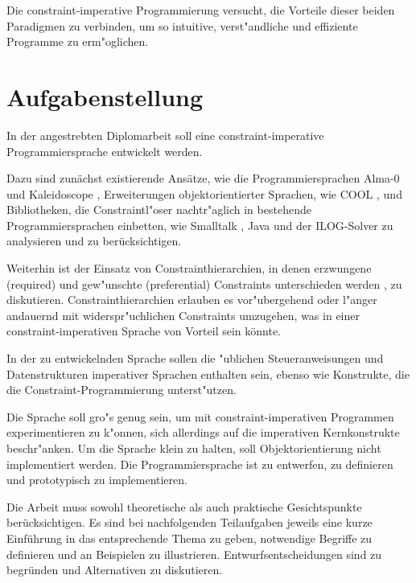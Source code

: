Die constraint-imperative Programmierung versucht, die Vorteile dieser
beiden Paradigmen zu verbinden, um so intuitive, verst"andliche und
effiziente Programme zu erm"oglichen.

\section*{Aufgabenstellung}

In der angestrebten Diplomarbeit soll eine constraint-imperative 
Programmiersprache entwickelt werden.

Dazu sind zun\"achst existierende Ans\"atze, wie die
Programmiersprachen Alma-0 \cite{apt97search,apt98alma} und
Kaleidoscope \cite{lopez94kaleidoscope,lopez94implementing},
Erweiterungen objektorientierter Sprachen, wie COOL
\cite{avesani90cool}, und Bibliotheken, die Constraintl"oser
nachtr"aglich in bestehende Programmiersprachen einbetten, wie
Smalltalk \cite{pachet95mixing}, Java
\cite{abdennadher01:jack:inp,Jack2} und der ILOG-Solver \cite{ILOG} zu
analysieren und zu ber\"ucksichtigen.

Weiterhin ist der Einsatz von Constrainthierarchien, in denen
erzwungene (required) und gew"unschte (preferential) Constraints
unterschieden werden
\cite{borning92constrainthierarchies,bartakHierarchies1}, zu
diskutieren.  Constrainthierarchien erlauben es vor"ubergehend oder
l"anger andauernd mit widerspr"uchlichen Constraints umzugehen, was in
einer constraint-imperativen Sprache von Vorteil sein k\"onnte.

In der zu entwickelnden Sprache sollen die "ublichen Steueranweisungen und
Datenstrukturen imperativer Sprachen enthalten sein, 
ebenso wie Konstrukte, die die Constraint-Programmierung unterst"utzen.

Die Sprache soll gro"s genug sein, um mit con\-straint-im\-perativen
Programmen experimentieren zu k"onnen, sich allerdings auf die
imperativen Kernkonstrukte beschr"anken. 
Um die Sprache klein zu halten, soll Objektorientierung nicht implementiert werden.
%
Die Programmiersprache ist zu entwerfen, zu definieren und
prototypisch zu implementieren.

Die Arbeit muss sowohl theoretische als auch praktische Gesichtspunkte 
ber\"ucksichtigen. Es sind bei nachfolgenden Teilaufgaben jeweils 
%
eine kurze Einf\"uhrung in das entsprechende Thema zu geben, 
notwendige Begriffe zu definieren und an Beispielen zu illustrieren.
%
Entwurfsentscheidungen sind zu begr\"unden und Alternativen zu diskutieren. 

